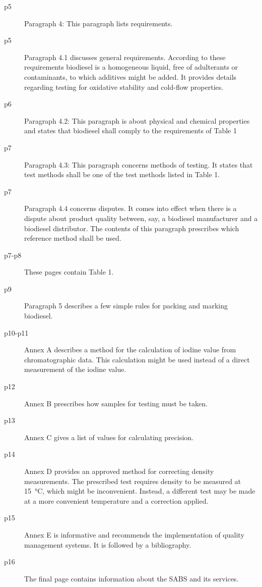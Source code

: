 \begin{description}
\item[p5]{Paragraph 4: This paragraph lists requirements.}

\item[p5]{Paragraph 4.1 discusses general requirements. According to these
requirements biodiesel is a homogeneous liquid, free of adulterants or
contaminants, to which additives might be added. It provides details regarding
testing for oxidative stability and cold-flow properties.}

\item[p6]{Paragraph 4.2: This paragraph is about physical and chemical
properties and states that biodiesel shall comply to the requirements of Table
1}

\item[p7]{Paragraph 4.3: This paragraph concerns methods of testing. It states
that test methods shall be  one of the test methods listed in Table 1.}

\item[p7]{Paragraph 4.4 concerns disputes. It comes into effect when there is a
dispute about product quality between, say, a biodiesel manufacturer and a
biodiesel distributor. The contents of this paragraph prescribes which reference
method shall be used.}

\item[p7-p8]{These pages contain Table 1.}

\item[p9]{Paragraph 5 describes a few simple rules for packing and marking
biodiesel.}

\item[p10-p11]{Annex A describes a method for the calculation of iodine value
from chromatographic data. This calculation might be used instead of a direct
measurement of the iodine value.}

\item[p12]{Annex B prescribes how samples for testing must be taken.}

\item[p13]{Annex C gives a list of values for calculating precision.}

\item[p14]{Annex D provides an approved method for correcting density
measurements. The prescribed test requires density to be measured at
\SI{15}{\celsius}, which might be inconvenient. Instead, a different test may be
made at a more convenient temperature and a correction applied. }

\item[p15]{Annex E is informative and recommends the implementation of quality
management systems. It is followed by a bibliography.}

\item[p16]{The final page contains information about the SABS and its services.}

\end{description} 

